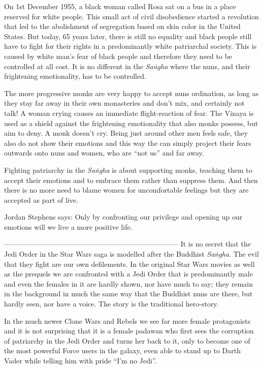 On 1st December 1955, a black woman called Rosa sat on a bus in a place reserved for white people. This small act of civil disobedience started a revolution that led to the abolishment of segregation based on skin color in the United States. But today, 65 years later, there is still no equality and black people still have to fight for their rights in a predominantly white patriarchal society. This is caused by white man's fear of black people and therefore they need to be controlled at all cost. It is no different in the {\em Saṅgha} where the nuns, and their frightening emotionality, has to be controlled. 

The more progressive monks are very happy to accept nuns ordination, as long as they stay far away in their own monasteries and don't mix, and certainly not talk! A woman crying causes an immediate flight-reaction of fear. The Vinaya is used as a shield against the frightening emotionality that also monks possess, but aim to deny. A monk doesn't cry. Being just around other men feels safe, they also do not show their emotions and this way the can simply project their fears outwards onto nuns and women, who are ``not us'' and far away.

Fighting patriarchy in the {\em Saṅgha} is about supporting monks, teaching them to accept their emotions and to embrace them rather than suppress them. And then there is no more need to blame women for uncomfortable feelings but they are accepted as part of live.

Jordan Stephens says: Only by confronting our privilege and opening up our emotions will we live a more positive life.

--------------------------------------------------------------------------
It is no secret that the Jedi Order in the Star Wars saga is modelled after the Buddhist {\em Saṅgha}. The evil that they fight are our own defilements. In the original Star Wars movies as well as the prequels we are confronted with a Jedi Order that is predominantly male and even the females in it are hardly shown, nor have much to say; they remain in the background in much the same way that the Buddhist nuns are there, but hardly seen, nor have a voice. The story is the traditional hero-story.

In the much newer Clone Wars and Rebels we see far more female protagonists and it is not surprising that it is a female padawan who first sees the corruption of patriarchy in the Jedi Order and turns her back to it, only to become one of the most powerful Force users in the galaxy, even able to stand up to Darth Vader while telling him with pride ``I'm no Jedi''.

